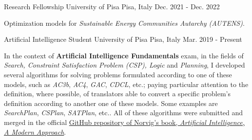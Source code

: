 

\begin{cventries}

  \cventry
    {Research Fellowship} %
    {University of Pisa} %
    {Pisa, Italy} %
    {Dec. 2021 - Dec. 2022} %
    {   
      \begin{cvitems} %
        \item {Optimization models for \textit{Sustainable Energy Communities Autarchy (AUTENS)}.}
      \end{cvitems}
    }

  \cventry
    {Artificial Intelligence Student} %
    {University of Pisa} %
    {Pisa, Italy} %
    {Mar. 2019 - Present} %
    {   
      \begin{cvitems} %
        \item {In the context of \textbf{Artificial Intelligence Fundamentals} exam, in the fields of \textit{Search, Constraint Satisfaction Problem (CSP), Logic} and \textit{Planning}, I developed several algorithms for solving problems formulated according to one of these models, such as \textit{AC3b}, \textit{AC4}, \textit{GAC}, \textit{CDCL}, etc.; paying particular attention to the definition, where possible, of translators able to convert a specific problem's definition according to another one of these models. Some examples are \textit{SearchPlan}, \textit{CSPlan}, \textit{SATPlan}, etc.. All of these algorithms were submitted and merged in the official \href{https://github.com/aimacode/aima-python}{GitHub repository of Norvig's book, \textit{Artificial Intelligence, A Modern Approach}}.}
      \end{cvitems}
    }


\end{cventries}
